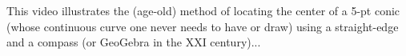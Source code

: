 This video illustrates the (age-old) method of locating the center of a 5-pt conic (whose continuous curve one never needs to have or draw) using a straight-edge and a compass (or GeoGebra in the XXI century)...